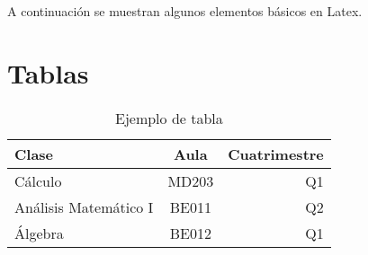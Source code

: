 A continuación se muestran algunos elementos básicos en Latex.

\section*{Tablas}

\begin{table}[!htbp]
	\begin{center}
		\begin{tabular}{| l | c | r |}
			\hline
			Clase & Aula & Cuatrimestre \\ 
			\hline
			\hline
			Cálculo & MD203 & Q1 \\
			\hline
			Análisis Matemático I & BE011 & Q2 \\
			\hline
			Álgebra & BE012 & Q1 \\ 
			\hline
		\end{tabular}
		\caption{Ejemplo de tabla}
		\label{tab:fruta}
	\end{center}
\end{table} 